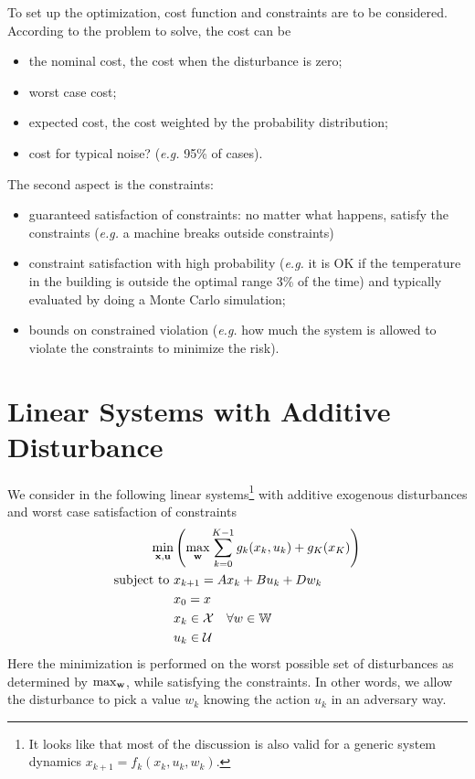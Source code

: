 To set up the optimization, cost function and constraints are to be considered. According to the problem to solve, the cost can be
\begin{itemize}
\item the nominal cost, the cost when the disturbance is zero;
\item worst case cost;
\item expected cost, the cost weighted by the probability distribution;
\item cost for typical noise? (\textit{e.g.} 95\% of cases).
\end{itemize}
The second aspect is the constraints:
\begin{itemize}
\item guaranteed satisfaction of constraints: no matter what happens, satisfy the constraints (\textit{e.g.} a machine breaks outside constraints)
\item constraint satisfaction with high probability (\textit{e.g.} it is OK if the temperature in the building is outside the optimal range 3\% of the time) and typically evaluated by doing a Monte Carlo simulation;
\item bounds on constrained violation (\textit{e.g.} how much the system is allowed to violate the constraints to minimize the risk).
\end{itemize}

\section{Linear Systems with Additive Disturbance}
\label{sec:linear-system-additive-disturbance}

We consider in the following linear systems\footnote{It looks like that most of the discussion is also valid for a generic system dynamics $x_{k+1}=f_k(x_k,u_k,w_k)$.} with additive exogenous disturbances and worst case satisfaction of constraints
\begin{equation}
  \label{eq:minimization-additive-disturbance}
  \begin{aligned}
    \min_{\boldsymbol{\mathrm{x}},\boldsymbol{\mathrm{u}}} & \left(\max_{\boldsymbol{\mathrm{w}}} \sum_{k=0}^{K-1} g_k(x_k,u_k) + g_K(x_K)\right) \\
    \text{subject to } & x_{k+1} = Ax_k + Bu_k + Dw_k \\
                     & x_0 = x \\
                     & x_k \in \mathcal{X}\quad \forall w \in \mathbb{W} \\
                     & u_k \in \mathcal{U}
  \end{aligned}
\end{equation}
Here the minimization is performed on the worst possible set of disturbances as determined by $\max_{\boldsymbol{\mathrm{w}}}$, while satisfying the constraints. In other words, we allow the disturbance to pick a value $w_k$ knowing the action $u_k$ in an adversary way.

